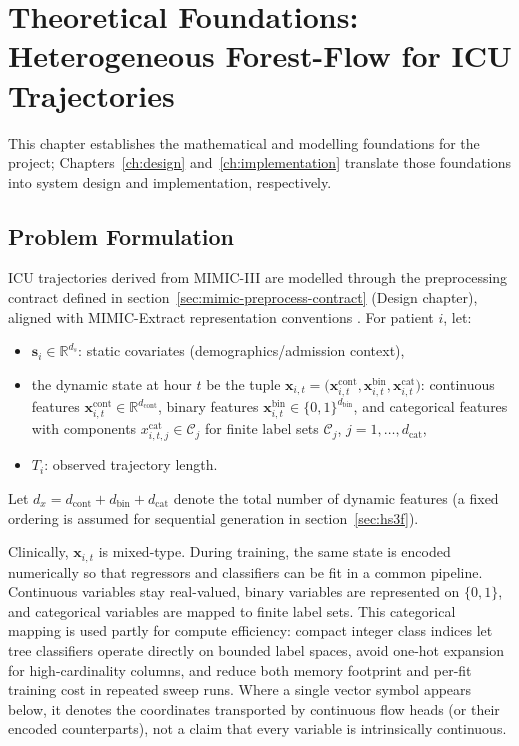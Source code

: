 \chapter{Theoretical Foundations: Heterogeneous Forest-Flow for ICU Trajectories}

This chapter establishes the mathematical and modelling foundations for the project; Chapters~\ref{ch:design} and~\ref{ch:implementation} translate those foundations into system design and implementation, respectively.

\section{Problem Formulation}

ICU trajectories derived from MIMIC-III \cite{johnson2016mimic} are modelled
through the preprocessing contract defined in
section~\ref{sec:mimic-preprocess-contract} (Design chapter), aligned with
MIMIC-Extract representation conventions \cite{wang2020mimicextract}.
For patient $i$, let:
\begin{itemize}\tightlist
    \item $\mathbf{s}_i \in \mathbb{R}^{d_s}$: static covariates (demographics/admission context),
    \item the dynamic state at hour $t$ be the tuple
    $\mathbf{x}_{i,t}=\bigl(\mathbf{x}_{i,t}^{\mathrm{cont}},\mathbf{x}_{i,t}^{\mathrm{bin}},\mathbf{x}_{i,t}^{\mathrm{cat}}\bigr)$:
    continuous features $\mathbf{x}_{i,t}^{\mathrm{cont}}\in\mathbb{R}^{d_{\mathrm{cont}}}$,
    binary features $\mathbf{x}_{i,t}^{\mathrm{bin}}\in\{0,1\}^{d_{\mathrm{bin}}}$,
    and categorical features with components $x_{i,t,j}^{\mathrm{cat}}\in\mathcal{C}_j$ for finite label sets $\mathcal{C}_j$, $j=1,\ldots,d_{\mathrm{cat}}$,
    \item $T_i$: observed trajectory length.
\end{itemize}
Let $d_x=d_{\mathrm{cont}}+d_{\mathrm{bin}}+d_{\mathrm{cat}}$ denote the total number of dynamic features (a fixed ordering is assumed for sequential generation in section~\ref{sec:hs3f}).

Clinically, $\mathbf{x}_{i,t}$ is mixed-type. During training, the same state is encoded numerically so that regressors and classifiers can be fit in a common pipeline. Continuous variables stay real-valued, binary variables are represented on $\{0,1\}$, and categorical variables are mapped to finite label sets. This categorical mapping is used partly for compute efficiency: compact integer class indices let tree classifiers operate directly on bounded label spaces, avoid one-hot expansion for high-cardinality columns, and reduce both memory footprint and per-fit training cost in repeated sweep runs. Where a single vector symbol appears below, it denotes the coordinates transported by continuous flow heads (or their encoded counterparts), not a claim that every variable is intrinsically continuous.

